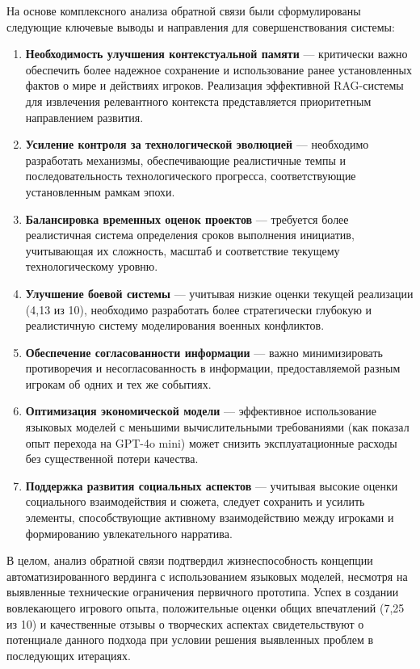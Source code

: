 На основе комплексного анализа обратной связи были сформулированы следующие ключевые выводы и направления для совершенствования системы:

\begin{enumerate}
    \item \textbf{Необходимость улучшения контекстуальной памяти} — критически важно обеспечить более надежное сохранение и использование ранее установленных фактов о мире и действиях игроков. Реализация эффективной RAG-системы для извлечения релевантного контекста представляется приоритетным направлением развития.

    \item \textbf{Усиление контроля за технологической эволюцией} — необходимо разработать механизмы, обеспечивающие реалистичные темпы и последовательность технологического прогресса, соответствующие установленным рамкам эпохи.

    \item \textbf{Балансировка временных оценок проектов} — требуется более реалистичная система определения сроков выполнения инициатив, учитывающая их сложность, масштаб и соответствие текущему технологическому уровню.

    \item \textbf{Улучшение боевой системы} — учитывая низкие оценки текущей реализации (4,13 из 10), необходимо разработать более стратегически глубокую и реалистичную систему моделирования военных конфликтов.

    \item \textbf{Обеспечение согласованности информации} — важно минимизировать противоречия и несогласованность в информации, предоставляемой разным игрокам об одних и тех же событиях.

    \item \textbf{Оптимизация экономической модели} — эффективное использование языковых моделей с меньшими вычислительными требованиями (как показал опыт перехода на GPT-4o mini) может снизить эксплуатационные расходы без существенной потери качества.

    \item \textbf{Поддержка развития социальных аспектов} — учитывая высокие оценки социального взаимодействия и сюжета, следует сохранить и усилить элементы, способствующие активному взаимодействию между игроками и формированию увлекательного нарратива.
\end{enumerate}

В целом, анализ обратной связи подтвердил жизнеспособность концепции автоматизированного вердинга с использованием языковых моделей, несмотря на выявленные технические ограничения первичного прототипа. Успех в создании вовлекающего игрового опыта, положительные оценки общих впечатлений (7,25 из 10) и качественные отзывы о творческих аспектах свидетельствуют о потенциале данного подхода при условии решения выявленных проблем в последующих итерациях.

